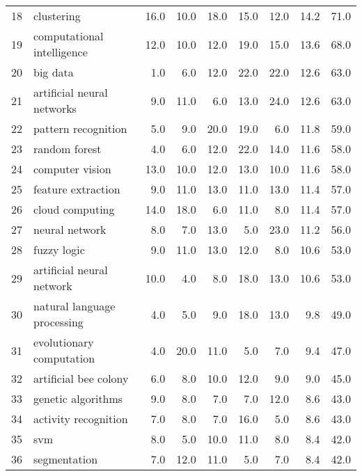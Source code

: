 \begin{tabular}{llrrrrrrr}
18 &                       clustering &  16.0 &  10.0 &   18.0 &   15.0 &   12.0 &   14.2 &   71.0 \\
19 &       computational intelligence &  12.0 &  10.0 &   12.0 &   19.0 &   15.0 &   13.6 &   68.0 \\
20 &                         big data &   1.0 &   6.0 &   12.0 &   22.0 &   22.0 &   12.6 &   63.0 \\
21 &       artificial neural networks &   9.0 &  11.0 &    6.0 &   13.0 &   24.0 &   12.6 &   63.0 \\
22 &              pattern recognition &   5.0 &   9.0 &   20.0 &   19.0 &    6.0 &   11.8 &   59.0 \\
23 &                    random forest &   4.0 &   6.0 &   12.0 &   22.0 &   14.0 &   11.6 &   58.0 \\
24 &                  computer vision &  13.0 &  10.0 &   12.0 &   13.0 &   10.0 &   11.6 &   58.0 \\
25 &               feature extraction &   9.0 &  11.0 &   13.0 &   11.0 &   13.0 &   11.4 &   57.0 \\
26 &                  cloud computing &  14.0 &  18.0 &    6.0 &   11.0 &    8.0 &   11.4 &   57.0 \\
27 &                   neural network &   8.0 &   7.0 &   13.0 &    5.0 &   23.0 &   11.2 &   56.0 \\
28 &                      fuzzy logic &   9.0 &  11.0 &   13.0 &   12.0 &    8.0 &   10.6 &   53.0 \\
29 &        artificial neural network &  10.0 &   4.0 &    8.0 &   18.0 &   13.0 &   10.6 &   53.0 \\
30 &      natural language processing &   4.0 &   5.0 &    9.0 &   18.0 &   13.0 &    9.8 &   49.0 \\
31 &         evolutionary computation &   4.0 &  20.0 &   11.0 &    5.0 &    7.0 &    9.4 &   47.0 \\
32 &            artificial bee colony &   6.0 &   8.0 &   10.0 &   12.0 &    9.0 &    9.0 &   45.0 \\
33 &               genetic algorithms &   9.0 &   8.0 &    7.0 &    7.0 &   12.0 &    8.6 &   43.0 \\
34 &             activity recognition &   7.0 &   8.0 &    7.0 &   16.0 &    5.0 &    8.6 &   43.0 \\
35 &                              svm &   8.0 &   5.0 &   10.0 &   11.0 &    8.0 &    8.4 &   42.0 \\
36 &                     segmentation &   7.0 &  12.0 &   11.0 &    5.0 &    7.0 &    8.4 &   42.0 \\

\end{tabular}
